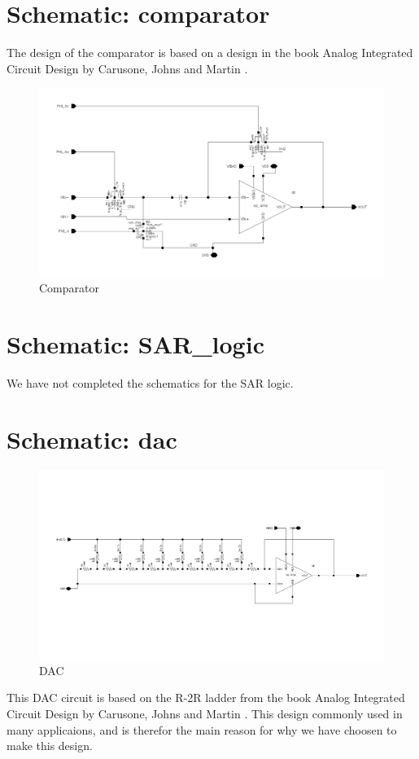 \documentclass[english, a4paper,11pt]{article}
\begin{document}
\section*{Schematic: comparator}
The design of the comparator is based on a design in the book Analog Integrated Circuit Design by Carusone, Johns and Martin \cite{Analog-integrated}. 
\begin{figure}[!ht]
 \centering
   \includegraphics[width=\textwidth]{img/comparator}
   \caption{Comparator}
   \label{comparator}
\end{figure}


\section*{Schematic: SAR\_logic}
We have not completed the schematics for the SAR logic.

\section*{Schematic: dac}
\begin{figure}[!ht]
 \centering
   \includegraphics[width=\textwidth]{img/dac}
   \caption{DAC}
   \label{dac}
\end{figure}
This DAC circuit is based on the R-2R ladder from the book Analog Integrated Circuit Design by Carusone, Johns and Martin \cite{Analog-integrated}. This design commonly used in many applicaions, and
is therefor the main reason for why we have choosen to make this design.
\end{document}
